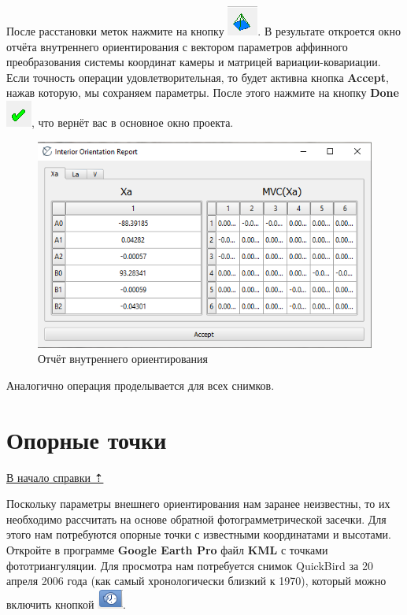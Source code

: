 \documentclass[
  12pt,
]{book}
\begin{document}
После расстановки меток нажмите на кнопку \includegraphics{images/Ref13/Execute_IO.png}. В результате откроется окно отчёта внутреннего ориентирования с вектором параметров аффинного преобразования системы координат камеры и матрицей вариации-ковариации. Если точность операции удовлетворительная, то будет активна кнопка \textbf{Accept}, нажав которую, мы сохраняем параметры. После этого нажмите на кнопку \textbf{Done} \includegraphics{images/Ref13/Done.png}, что вернёт вас в основное окно проекта.

\begin{figure}
\centering
\includegraphics{images/Ref13/IO_Report.png}
\caption{Отчёт внутреннего ориентирования}
\end{figure}

Аналогично операция проделывается для всех снимков.

\hypertarget{stereo-GCP}{%
\section{Опорные точки}\label{stereo-GCP}}

\protect\hyperlink{stereo}{В начало справки ⇡}

Поскольку параметры внешнего ориентирования нам заранее неизвестны, то их необходимо рассчитать на основе обратной фотограмметрической засечки. Для этого нам потребуются опорные точки с известными координатами и высотами. Откройте в программе \textbf{Google Earth Pro} файл \textbf{KML} с точками фототриангуляции. Для просмотра нам потребуется снимок QuickBird за 20 апреля 2006 года (как самый хронологически близкий к 1970), который можно включить кнопкой \includegraphics{images/Ref13/Hystorical.png}.
\end{document}
